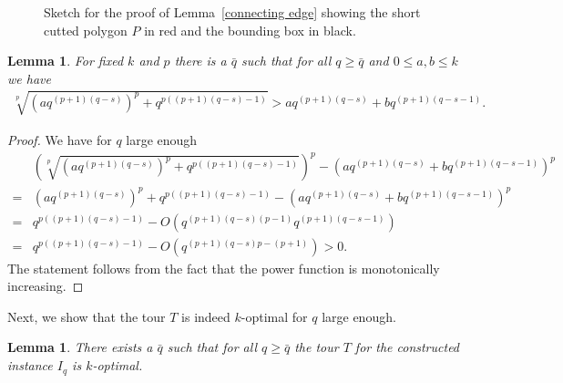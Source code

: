\documentclass[a4paper, 11pt]{article}
\newtheorem{lemma}[theorem]{Lemma}
\begin{document}
\begin{figure}[!htb]
  \caption{Sketch for the proof of Lemma~\ref{connecting edge} showing the short cutted polygon $P$ in red and the bounding box in black.}
  \label{sketch connecting edge}
\end{figure}

\begin{lemma}\label{estimate}
For fixed $k$ and $p$ there is a $\bar{q}$ such that for all $q\geq \bar{q}$ and $0\leq a,b\leq k$ we have
\begin{align*}
\sqrt[p]{(aq^{(p+1)(q-s)})^p+q^{p((p+1)(q-s)-1)}}>a q^{(p+1)(q-s)}+bq^{(p+1)(q-s-1)}.
\end{align*}
\end{lemma}

\begin{proof}
We have for $q$ large enough
\begin{align*}
&\left(\sqrt[p]{(a q^{(p+1)(q-s)})^p+q^{p((p+1)(q-s)-1)}}\right)^p-(a q^{(p+1)(q-s)}+bq^{(p+1)(q-s-1)})^p \\
=&(a q^{(p+1)(q-s)})^p+q^{p((p+1)(q-s)-1)}-(a q^{(p+1)(q-s)}+bq^{(p+1)(q-s-1)})^p\\
=&q^{p((p+1)(q-s)-1)}-O(q^{(p+1)(q-s)(p-1)}q^{(p+1)(q-s-1)})\\
=&q^{p((p+1)(q-s)-1)}-O(q^{(p+1)(q-s)p-(p+1)})>0.
\end{align*}
The statement follows from the fact that the power function is monotonically increasing.
\end{proof}

Next, we show that the tour $T$ is indeed $k$-optimal for $q$ large enough. 

\begin{lemma} \label{k optimal eulerian}
There exists a $\bar{q}$ such that for all $q\geq \bar{q}$ the tour $T$ for the constructed instance $I_q$ is $k$-optimal.
\end{lemma}
\end{document}
